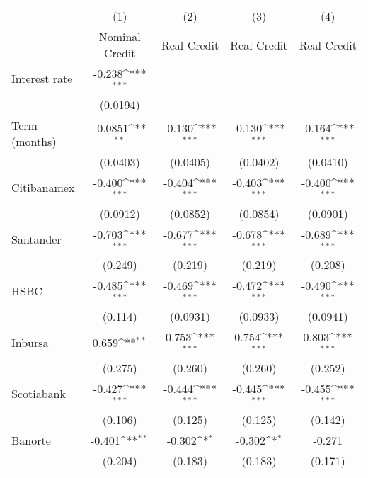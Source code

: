 {
\def\sym#1{\ifmmode^{#1}\else\(^{#1}\)\fi}
\begin{tabular}{l*{4}{c}}
\hline\hline
                &\multicolumn{1}{c}{(1)}&\multicolumn{1}{c}{(2)}&\multicolumn{1}{c}{(3)}&\multicolumn{1}{c}{(4)}\\
                &\multicolumn{1}{c}{Nominal Credit}&\multicolumn{1}{c}{Real Credit}&\multicolumn{1}{c}{Real Credit}&\multicolumn{1}{c}{Real Credit}\\
\hline
Interest rate   &   -0.238\sym{***}&                  &                  &                  \\
                & (0.0194)         &                  &                  &                  \\
Term (months)   &  -0.0851\sym{**} &   -0.130\sym{***}&   -0.130\sym{***}&   -0.164\sym{***}\\
                & (0.0403)         & (0.0405)         & (0.0402)         & (0.0410)         \\
Citibanamex     &   -0.400\sym{***}&   -0.404\sym{***}&   -0.403\sym{***}&   -0.400\sym{***}\\
                & (0.0912)         & (0.0852)         & (0.0854)         & (0.0901)         \\
Santander       &   -0.703\sym{***}&   -0.677\sym{***}&   -0.678\sym{***}&   -0.689\sym{***}\\
                &  (0.249)         &  (0.219)         &  (0.219)         &  (0.208)         \\
HSBC            &   -0.485\sym{***}&   -0.469\sym{***}&   -0.472\sym{***}&   -0.490\sym{***}\\
                &  (0.114)         & (0.0931)         & (0.0933)         & (0.0941)         \\
Inbursa         &    0.659\sym{**} &    0.753\sym{***}&    0.754\sym{***}&    0.803\sym{***}\\
                &  (0.275)         &  (0.260)         &  (0.260)         &  (0.252)         \\
Scotiabank      &   -0.427\sym{***}&   -0.444\sym{***}&   -0.445\sym{***}&   -0.455\sym{***}\\
                &  (0.106)         &  (0.125)         &  (0.125)         &  (0.142)         \\
Banorte         &   -0.401\sym{**} &   -0.302\sym{*}  &   -0.302\sym{*}  &   -0.271         \\
                &  (0.204)         &  (0.183)         &  (0.183)         &  (0.171)         \\

\end{tabular}}

